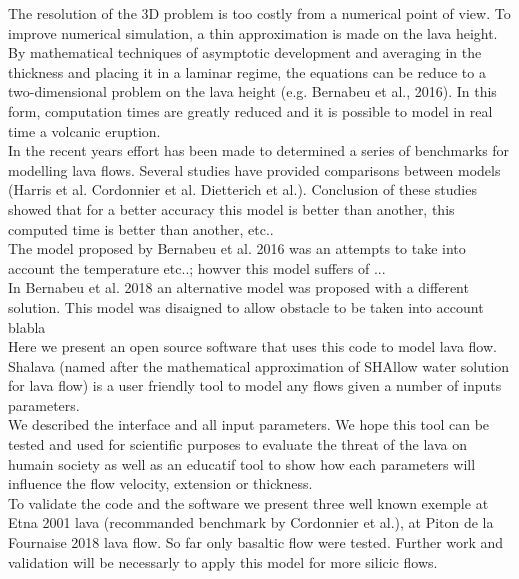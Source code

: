 \documentclass[11pt,a4paper]{article}
\begin{document}
The resolution of the 3D problem is too costly from a numerical point of view. To improve numerical simulation, a thin approximation is made on the lava height. By mathematical techniques of asymptotic development and averaging in the thickness and placing it in a laminar regime, the equations can be reduce to a two-dimensional problem on the lava height (e.g. Bernabeu et al., 2016). In this form, computation times are greatly reduced and it is possible to model in real time a volcanic eruption.\\
In the recent years effort has been made to determined a series of benchmarks for modelling lava flows. Several studies have provided comparisons between models (Harris et al. Cordonnier et al. Dietterich et al.). Conclusion of these studies showed that for a better accuracy this model is better than another, this computed time is better than another, etc..\\
The model proposed by Bernabeu et al. 2016 was an attempts to take into account the temperature etc..; howver this model suffers of ...\\
In Bernabeu et al. 2018 an alternative model was proposed with a different solution. This model was disaigned to allow obstacle to be taken into account blabla\\
Here we present an open source software that uses this code to model lava flow. Shalava (named after the mathematical approximation of SHAllow water solution for lava flow) is a user friendly tool to model any flows given a number of inputs parameters.\\
We described the interface and all input parameters. We hope this tool can be tested and used for scientific purposes to evaluate the threat of the lava on humain society as well as an educatif tool to show how each parameters will influence the flow velocity, extension or thickness.\\
To validate the code and the software we present three well known exemple at Etna 2001 lava (recommanded benchmark by Cordonnier et al.), at Piton de la Fournaise 2018 lava flow.
So far only basaltic flow were tested. Further work and validation will be necessarly to apply this model for more silicic flows.


\end{document}
